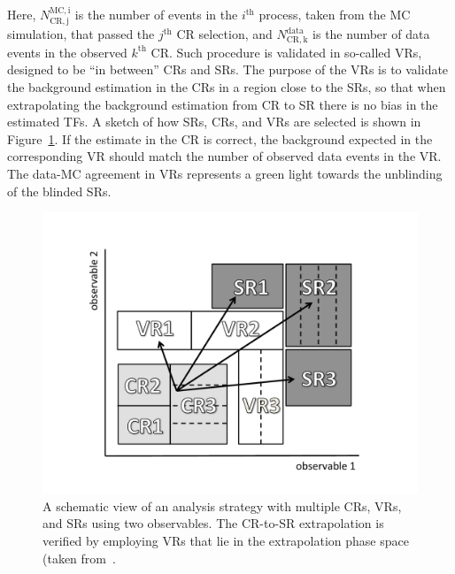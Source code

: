 		\noindent Here, $N_{\mathrm{CR,j}}^{\mathrm{MC,i}}$ is the number of events in the $i^{\mathrm{th}}$ process, taken from the \ac{MC} simulation, that passed the $j^{\mathrm{th}}$ CR selection, and $N_{\mathrm{CR,k}}^{\mathrm{data}}$ is the number of data events in the observed $k^{\mathrm{th}}$ \ac{CR}. Such procedure is validated in so-called \acp{VR}, designed to be ``in between'' \acp{CR} and \acp{SR}. The purpose of the \acp{VR} is to validate the background estimation in the \acp{CR} in a region close to the \acp{SR}, so that when extrapolating the background estimation from \ac{CR} to \ac{SR} there is no bias in the estimated \acp{TF}. A sketch of how \acp{SR}, \acp{CR}, and \acp{VR} are selected is shown in Figure~\ref{fig:extrapolation}. If the estimate in the \ac{CR} is correct, the background expected in the corresponding \ac{VR} should match the number of observed data events in the \ac{VR}. The data-\ac{MC} agreement in \acp{VR} represents a green light towards the unblinding of the blinded \acp{SR}.

		\begin{figure}[!htb]
		  \begin{center}
		   \includegraphics[width=\textwidth]{figures/stop/cartoon_CRVRSR_bw}
		   \caption{A schematic view of an analysis strategy with multiple \acp{CR}, \acp{VR}, and \acp{SR} using two observables. The \ac{CR}-to-\ac{SR} extrapolation is verified by employing \acp{VR} that lie in the extrapolation phase space (taken from~\cite{histfitter}.}
		   \label{fig:extrapolation}
		  \end{center}
		\end{figure}

